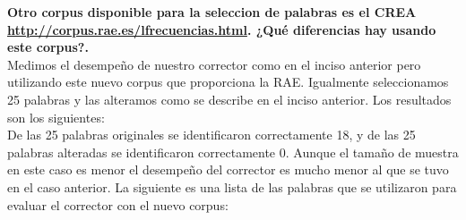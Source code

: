 \documentclass[paper=letter, fontsize=11pt]{scrartcl}
\numberwithin{equation}{section} %
\numberwithin{figure}{section} %
\numberwithin{table}{section} %
\begin{document}
\textbf{
Otro corpus disponible para la seleccion de palabras es el CREA
\url{http://corpus.rae.es/lfrecuencias.html}. ¿Qué diferencias hay usando este corpus?.}\\

Medimos el desempeño de nuestro corrector como en el inciso anterior pero utilizando este nuevo corpus que proporciona la RAE. Igualmente seleccionamos 25 palabras y las alteramos como se describe en el inciso anterior. Los resultados son los siguientes:\\

De las 25 palabras originales se identificaron correctamente 18, y de las 25 palabras alteradas se identificaron correctamente 0. Aunque el tamaño de muestra en este caso es menor el desempeño del corrector es mucho menor al que se tuvo en el caso anterior. La siguiente es una lista de las palabras que se utilizaron para evaluar el corrector con el nuevo corpus:
\end{document}
